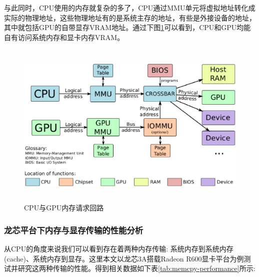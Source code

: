 与此同时，CPU使用的内存就复杂的多了，CPU通过MMU单元将虚拟地址转化成实际的物理地址，这些物理地址有的是系统主存的地址，有些是外接设备的地址，其中就包括GPU的自带显存VRAM地址。通过下图\ref{fig:cpu-gpu-mm}可以看到，CPU和GPU均能自有访问系统内存和显卡内存VRAM。

\begin{figure}[H] 
  \centering
  \includegraphics[width=12cm,height=8cm]{figures/chap03/cpu-gpu-mm}
  \caption{CPU与GPU内存请求回路}
  \label{fig:cpu-gpu-mm}
\end{figure}

\subsubsection{龙芯平台下内存与显存传输的性能分析}

从CPU的角度来说我们可以看到存在着两种内存传输: 系统内存到系统内存(cache)、系统内存到显存。这里本文以龙芯3A搭载Radeon R600显卡平台为例测试并研究这两种传输的性能。得到相关数据如下表\ref{tab:memcpy-performance}所示:


